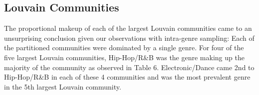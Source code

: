 \documentclass[pageno]{jpaper}
\begin{document}
\subsection{Louvain Communities}
\begin{table}[H]
\caption{Top Genre Makeup in n'th Largest Louvain Communities}
\label{table:table6}
\end{table}
The proportional makeup of each of the largest Louvain communities came to an unsurprising conclusion given our observations with intra-genre sampling: Each of the partitioned communities were dominated by a single genre. For four of the five largest Louvain communities, Hip-Hop/R\&B was the genre making up the majority of the community as observed in Table 6. Electronic/Dance came 2nd to Hip-Hop/R\&B in each of these 4 communities and was the most prevalent genre in the 5th largest Louvain community.
\end{document}
